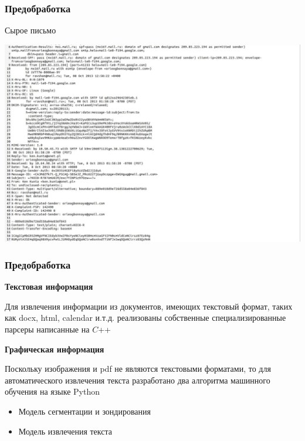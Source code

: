 \documentclass[compress,professionalfont]{beamer}
\begin{document}
\begin{frame}
\frametitle{Предобработка}

Сырое письмо
\begin{center}
\includegraphics[width=.9\textwidth]{eml_raw.jpg}
\end{center}

\end{frame}

\begin{frame}
\frametitle{Предобработка}

\textbf{Текстовая информация}

Для извлечения информации из документов, имеющих текстовый формат, таких как docx, html, calendar и.т.д. реализованы собственные специализированные парсеры написанные на $C$++

\textbf{Графическая информация}

Поскольку изображения и pdf не являются текстовыми форматами, то
для автоматического извлечения текста разработано два алгоритма машинного обучения на языке Python
\begin{itemize}
\item Модель сегментации и зондирования
\item Модель извлечения текста
\end{itemize}

\end{frame}
\end{document}
